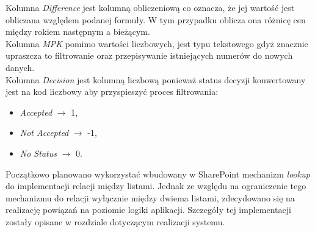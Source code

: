     \noindent Kolumna \emph{Difference} jest kolumną obliczeniową co oznacza, że jej wartość jest obliczana względem podanej formuły. W tym przypadku oblicza ona różnicę cen między rokiem następnym a bieżącym. \\
    Kolumna \emph{MPK} pomimo wartości liczbowych, jest typu tekstowego gdyż znacznie upraszcza to filtrowanie oraz przepisywanie istniejących numerów do nowych danych. \\
    Kolumna \emph{Decision} jest kolumną liczbową ponieważ status decyzji konwertowany jest na kod liczbowy aby przyspieszyć proces filtrowania:
    \begin{itemize}
        \item \emph{Accepted} $\rightarrow$ 1,
        \item \emph{Not Accepted} $\rightarrow$ -1,
        \item \emph{No Status} $\rightarrow$ 0.
    \end{itemize}

    Początkowo planowano wykorzystać wbudowany w SharePoint mechanizm \emph{lookup} do implementacji relacji między listami. Jednak ze względu na ograniczenie tego mechanizmu do relacji wyłącznie między dwiema listami, zdecydowano się na realizację powiązań na poziomie logiki aplikacji. Szczegóły tej implementacji zostały opisane w rozdziale dotyczącym realizacji systemu.
    

